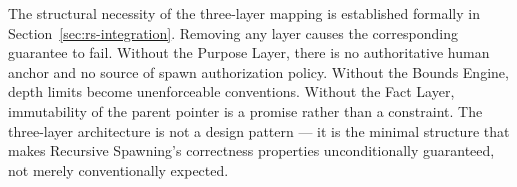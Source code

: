 The structural necessity of the three-layer mapping is established formally in Section~\ref{sec:rs-integration}. Removing any layer causes the corresponding guarantee to fail. Without the Purpose Layer, there is no authoritative human anchor and no source of spawn authorization policy. Without the Bounds Engine, depth limits become unenforceable conventions. Without the Fact Layer, immutability of the parent pointer is a promise rather than a constraint. The three-layer architecture is not a design pattern — it is the minimal structure that makes Recursive Spawning's correctness properties unconditionally guaranteed, not merely conventionally expected.


